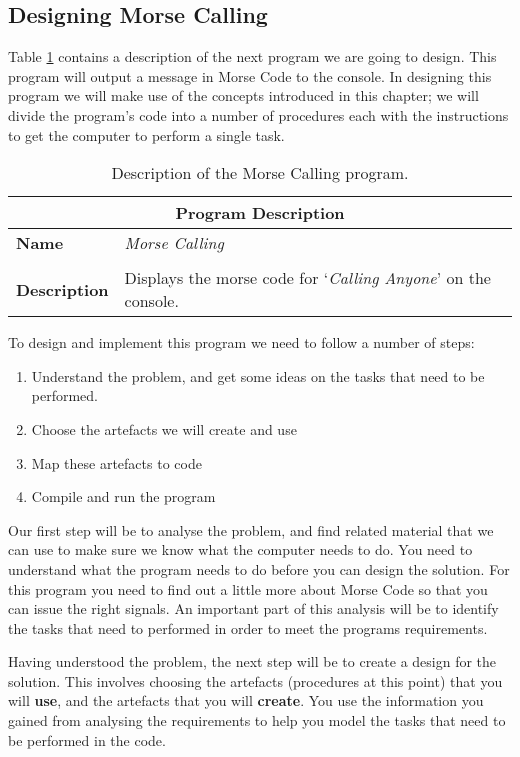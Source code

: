 \subsection{Designing Morse Calling} %
\label{sub:designing_morse_calling}

Table \ref{tbl:procedure-decl-morse_calling} contains a description of the next program we are going to design. This program will output a message in Morse Code to the console. In designing this program we will make use of the concepts introduced in this chapter; we will divide the program's code into a number of procedures each with the instructions to get the computer to perform a single task.

\begin{table}[h]
\centering
\begin{tabular}{l|p{10cm}}
  \hline
  \multicolumn{2}{c}{\textbf{Program Description}} \\
  \hline
  \textbf{Name} & \emph{Morse Calling} \\
  \\
  \textbf{Description} & Displays the morse code for `\emph{Calling Anyone}' on the console. \\
  \hline
\end{tabular}
\caption{Description of the Morse Calling program.}
\label{tbl:procedure-decl-morse_calling}
\end{table}

To design and implement this program we need to follow a number of steps:
\begin{enumerate}
  \item Understand the problem, and get some ideas on the tasks that need to be performed.
  \item Choose the artefacts we will create and use
  \item Map these artefacts to code
  \item Compile and run the program
\end{enumerate}

Our first step will be to analyse the problem, and find related material that we can use to make sure we know what the computer needs to do. You need to understand what the program needs to do before you can design the solution. For this program you need to find out a little more about Morse Code so that you can issue the right signals. An important part of this analysis will be to identify the tasks that need to performed in order to meet the programs requirements.

Having understood the problem, the next step will be to create a design for the solution. This involves choosing the artefacts (procedures at this point) that you will \textbf{use}, and the artefacts that you will \textbf{create}. You use the information you gained from analysing the requirements to help you model the tasks that need to be performed in the code.

